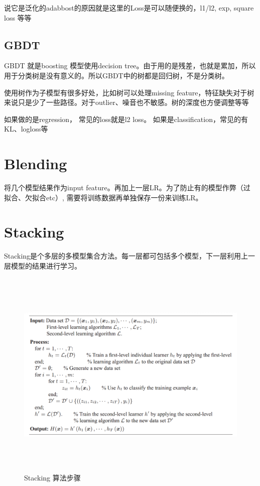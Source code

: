 \documentclass[12pt,a4paper,oneside]{article}
\begin{document}
\begin{CJK*}{UTF8}{gbsn}
说它是泛化的adabbost的原因就是这里的Loss是可以随便换的，l1/l2, exp, square loss 等等

\subsection{GBDT}
GBDT 就是boosting 模型使用decision tree。由于用的是残差，也就是累加，所以用于分类树是没有意义的。所以GBDT中的树都是回归树，不是分类树。

使用树作为子模型有很多好处，比如树可以处理missing feature，特征缺失对于树来说只是少了一些路径。对于outlier、噪音也不敏感。树的深度也方便调整等等

如果做的是regression， 常见的loss就是l2 loss。 如果是classification，常见的有KL、logloss等

\section{Blending}
将几个模型结果作为input feature。再加上一层LR。为了防止有的模型作弊（过拟合、欠拟合etc）, 需要将训练数据再单独保存一份来训练LR。

\section{Stacking}
Stacking是个多层的多模型集合方法。每一层都可包括多个模型，下一层利用上一层模型的结果进行学习。

\begin{figure}[H]
\centering
\includegraphics[width=6in,height=4in]{stacking}
\caption{Stacking 算法步骤}
\end{figure}



\end{CJK*}
\end{document}

